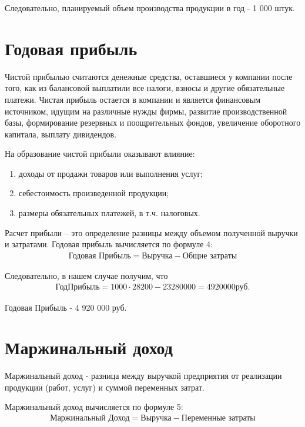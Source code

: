 Следовательно, планируемый объем производства продукции в год - 1 000 штук.

\newpage
\section*{Годовая прибыль}

Чистой прибылью считаются денежные средства, оставшиеся у компании после
того, как из балансовой выплатили все налоги, взносы и другие обязательные
платежи. Чистая прибыль остается в компании и является финансовым
источником, идущим на различные нужды фирмы, развитие производственной
базы, формирование резервных и поощрительных фондов, увеличение
оборотного капитала, выплату дивидендов.

На образование чистой прибыли оказывают влияние:
\begin{enumerate}
	 \item доходы от продажи товаров или выполнения услуг;
\item себестоимость произведенной продукции;
\item размеры обязательных платежей, в т.ч. налоговых.
\end{enumerate}

Расчет прибыли – это определение разницы между объемом полученной
выручки и затратами. Годовая прибыль вычисляется по формуле 4:
\begin{align}\text{Годовая Прибыль}=\text{Выручка}-\text{Общие затраты} \end{align}

Следовательно, в нашем случае получим, что 
\begin{align}\text{ГодПрибыль} = 1 000 \cdot 28 200 - 23 280 000 = 4 920 000 \text{руб}.
\end{align}

Годовая Прибыль - 4 920 000 руб.

\newpage
\section*{Маржинальный доход}

Маржинальный доход - разница между выручкой предприятия от реализации продукции (работ, услуг) и суммой переменных затрат. 

Маржинальный доход вычисляется по формуле 5:
\begin{align}\text{Маржинальный Доход}=\text{Выручка}-\text{Переменные затраты} \end{align}

